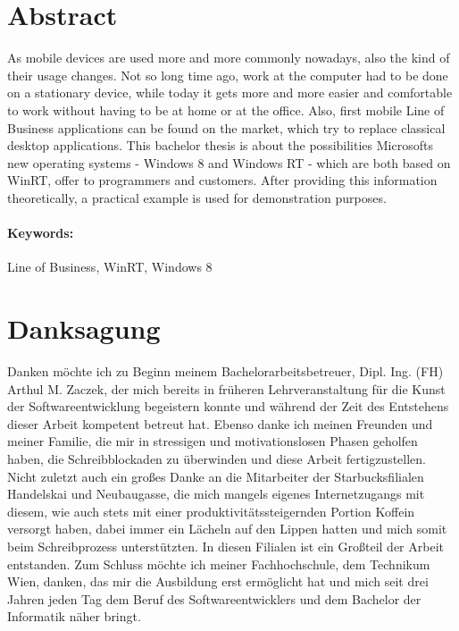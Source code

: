 \documentclass[a4paper,bibtotoc,oneside]{scrbook}
\begin{document}
\section*{Abstract}\thispagestyle{empty}
As mobile devices are used more and more commonly nowadays, also the kind of their usage changes. Not so long time ago, work at the computer had to be done on a stationary device, while today it gets more and more easier and comfortable to work without having to be at home or at the office.
\newline
Also, first mobile Line of Business applications can be found on the market, which try to replace classical desktop applications.
\newline
This bachelor thesis is about the possibilities Microsofts new operating systems - Windows 8 and Windows RT - which are both based on WinRT, offer to programmers and customers. After providing this information theoretically, a practical example is used for demonstration purposes.
\\ \vfill
\paragraph*{Keywords:} Line of Business, WinRT, Windows 8
\newpage

\section*{Danksagung}
\thispagestyle{empty}
Danken möchte ich zu Beginn meinem Bachelorarbeitsbetreuer, Dipl. Ing. (FH) Arthul M. Zaczek, der mich bereits in früheren Lehrveranstaltung für die Kunst der Softwareentwicklung begeistern konnte und während der Zeit des Entstehens dieser Arbeit kompetent betreut hat.
\newline
\newline
Ebenso danke ich meinen Freunden und meiner Familie, die mir in stressigen und motivationslosen Phasen geholfen haben, die Schreibblockaden zu überwinden und diese Arbeit fertigzustellen.
\newline
\newline
Nicht zuletzt auch ein großes Danke an die Mitarbeiter der Starbucksfilialen Handelskai und Neubaugasse, die mich mangels eigenes Internetzugangs mit diesem, wie auch stets mit einer produktivitätssteigernden Portion Koffein versorgt haben, dabei immer ein Lächeln auf den Lippen hatten und mich somit beim Schreibprozess unterstützten. In diesen Filialen ist ein Großteil der Arbeit entstanden.
\newline
\newline
Zum Schluss möchte ich meiner Fachhochschule, dem Technikum Wien, danken, das mir die Ausbildung erst ermöglicht hat und mich seit drei Jahren jeden Tag dem Beruf des Softwareentwicklers und dem Bachelor der Informatik näher bringt.
\end{document}
